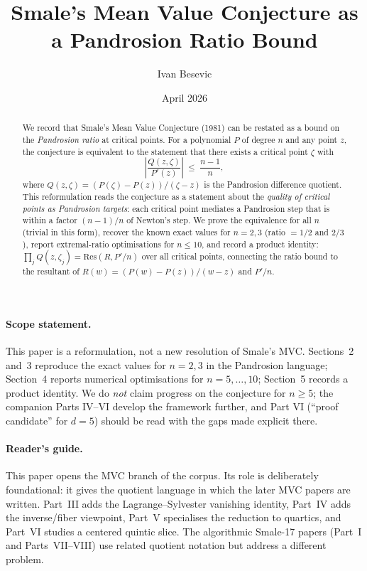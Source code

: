 \documentclass[11pt,a4paper]{article}
\title{Smale's Mean Value Conjecture as a Pandrosion Ratio Bound}
\author{Ivan Besevic}
\date{April 2026}
\begin{document}
\maketitle

\begin{abstract}
We record that Smale's Mean Value Conjecture (1981) can be restated as a bound on the \emph{Pandrosion ratio} at critical points. For a polynomial $P$ of degree $n$ and any point $z$, the conjecture is equivalent to the statement that there exists a critical point $\zeta$ with
$$ \left|\frac{Q(z, \zeta)}{P'(z)}\right| \;\le\; \frac{n - 1}{n}, $$
where $Q(z, \zeta) = (P(\zeta) - P(z))/(\zeta - z)$ is the Pandrosion difference quotient. This reformulation reads the conjecture as a statement about the \emph{quality of critical points as Pandrosion targets}: each critical point mediates a Pandrosion step that is within a factor $(n - 1)/n$ of Newton's step. We prove the equivalence for all $n$ (trivial in this form), recover the known exact values for $n = 2, 3$ (ratio $= 1/2$ and $2/3$), report extremal-ratio optimisations for $n \le 10$, and record a product identity: $\prod_j Q(z, \zeta_j) = \mathrm{Res}(R, P'/n)$ over all critical points, connecting the ratio bound to the resultant of $R(w) = (P(w)-P(z))/(w-z)$ and $P'/n$.
\end{abstract}

\paragraph{Scope statement.} This paper is a reformulation, not a new resolution of Smale's MVC. Sections~2 and~3 reproduce the exact values for $n = 2, 3$ in the Pandrosion language; Section~4 reports numerical optimisations for $n = 5, \dots, 10$; Section~5 records a product identity. We do \emph{not} claim progress on the conjecture for $n \ge 5$; the companion Parts IV--VI develop the framework further, and Part VI (``proof candidate'' for $d = 5$) should be read with the gaps made explicit there.

\paragraph{Reader's guide.}
This paper opens the MVC branch of the corpus. Its role is deliberately
foundational: it gives the quotient language in which the later MVC papers are
written. Part~III adds the Lagrange--Sylvester vanishing identity, Part~IV adds
the inverse/fiber viewpoint, Part~V specialises the reduction to quartics, and
Part~VI studies a centered quintic slice. The algorithmic Smale-17 papers
(Part~I and Parts~VII--VIII) use related quotient notation but address a
different problem.
\end{document}
